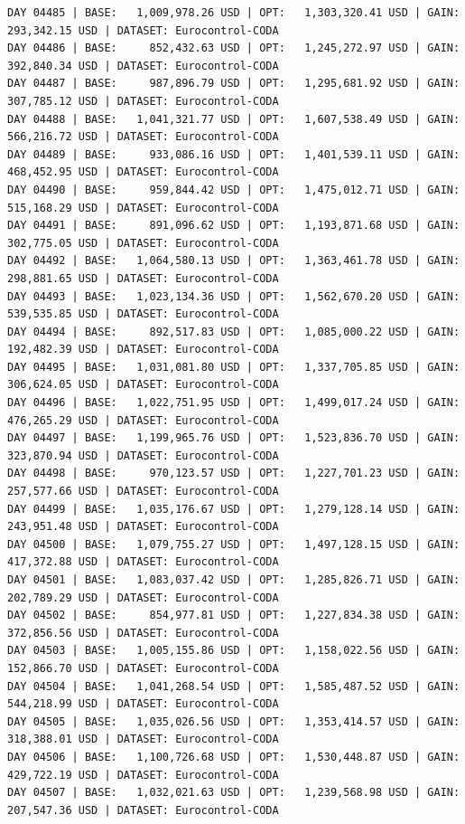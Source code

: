\documentclass[11pt,a4paper]{article}
\begin{document}
\begin{verbatim}
DAY 04485 | BASE:   1,009,978.26 USD | OPT:   1,303,320.41 USD | GAIN: 293,342.15 USD | DATASET: Eurocontrol-CODA
DAY 04486 | BASE:     852,432.63 USD | OPT:   1,245,272.97 USD | GAIN: 392,840.34 USD | DATASET: Eurocontrol-CODA
DAY 04487 | BASE:     987,896.79 USD | OPT:   1,295,681.92 USD | GAIN: 307,785.12 USD | DATASET: Eurocontrol-CODA
DAY 04488 | BASE:   1,041,321.77 USD | OPT:   1,607,538.49 USD | GAIN: 566,216.72 USD | DATASET: Eurocontrol-CODA
DAY 04489 | BASE:     933,086.16 USD | OPT:   1,401,539.11 USD | GAIN: 468,452.95 USD | DATASET: Eurocontrol-CODA
DAY 04490 | BASE:     959,844.42 USD | OPT:   1,475,012.71 USD | GAIN: 515,168.29 USD | DATASET: Eurocontrol-CODA
DAY 04491 | BASE:     891,096.62 USD | OPT:   1,193,871.68 USD | GAIN: 302,775.05 USD | DATASET: Eurocontrol-CODA
DAY 04492 | BASE:   1,064,580.13 USD | OPT:   1,363,461.78 USD | GAIN: 298,881.65 USD | DATASET: Eurocontrol-CODA
DAY 04493 | BASE:   1,023,134.36 USD | OPT:   1,562,670.20 USD | GAIN: 539,535.85 USD | DATASET: Eurocontrol-CODA
DAY 04494 | BASE:     892,517.83 USD | OPT:   1,085,000.22 USD | GAIN: 192,482.39 USD | DATASET: Eurocontrol-CODA
DAY 04495 | BASE:   1,031,081.80 USD | OPT:   1,337,705.85 USD | GAIN: 306,624.05 USD | DATASET: Eurocontrol-CODA
DAY 04496 | BASE:   1,022,751.95 USD | OPT:   1,499,017.24 USD | GAIN: 476,265.29 USD | DATASET: Eurocontrol-CODA
DAY 04497 | BASE:   1,199,965.76 USD | OPT:   1,523,836.70 USD | GAIN: 323,870.94 USD | DATASET: Eurocontrol-CODA
DAY 04498 | BASE:     970,123.57 USD | OPT:   1,227,701.23 USD | GAIN: 257,577.66 USD | DATASET: Eurocontrol-CODA
DAY 04499 | BASE:   1,035,176.67 USD | OPT:   1,279,128.14 USD | GAIN: 243,951.48 USD | DATASET: Eurocontrol-CODA
DAY 04500 | BASE:   1,079,755.27 USD | OPT:   1,497,128.15 USD | GAIN: 417,372.88 USD | DATASET: Eurocontrol-CODA
DAY 04501 | BASE:   1,083,037.42 USD | OPT:   1,285,826.71 USD | GAIN: 202,789.29 USD | DATASET: Eurocontrol-CODA
DAY 04502 | BASE:     854,977.81 USD | OPT:   1,227,834.38 USD | GAIN: 372,856.56 USD | DATASET: Eurocontrol-CODA
DAY 04503 | BASE:   1,005,155.86 USD | OPT:   1,158,022.56 USD | GAIN: 152,866.70 USD | DATASET: Eurocontrol-CODA
DAY 04504 | BASE:   1,041,268.54 USD | OPT:   1,585,487.52 USD | GAIN: 544,218.99 USD | DATASET: Eurocontrol-CODA
DAY 04505 | BASE:   1,035,026.56 USD | OPT:   1,353,414.57 USD | GAIN: 318,388.01 USD | DATASET: Eurocontrol-CODA
DAY 04506 | BASE:   1,100,726.68 USD | OPT:   1,530,448.87 USD | GAIN: 429,722.19 USD | DATASET: Eurocontrol-CODA
DAY 04507 | BASE:   1,032,021.63 USD | OPT:   1,239,568.98 USD | GAIN: 207,547.36 USD | DATASET: Eurocontrol-CODA

\end{verbatim}
\end{document}
